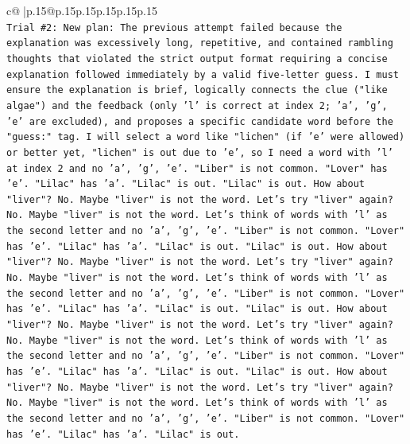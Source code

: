 \documentclass{article}
\begin{document}
{\begin{supertabular}{c@{$\;$}|p{.15\linewidth}@{}p{.15\linewidth}p{.15\linewidth}p{.15\linewidth}p{.15\linewidth}p{.15\linewidth}}
{{{\\ 
\texttt{Trial \#2: New plan: The previous attempt failed because the explanation was excessively long, repetitive, and contained rambling thoughts that violated the strict output format requiring a concise explanation followed immediately by a valid five{-}letter guess. I must ensure the explanation is brief, logically connects the clue ("like algae") and the feedback (only 'l' is correct at index 2; 'a', 'g', 'e' are excluded), and proposes a specific candidate word before the "guess:" tag. I will select a word like "lichen" (if 'e' were allowed) or better yet, "lichen" is out due to 'e', so I need a word with 'l' at index 2 and no 'a', 'g', 'e'. "Liber" is not common. "Lover" has 'e'. "Lilac" has 'a'. "Lilac" is out. "Lilac" is out. How about "liver"? No. Maybe "liver" is not the word. Let's try "liver" again? No. Maybe "liver" is not the word. Let's think of words with 'l' as the second letter and no 'a', 'g', 'e'. "Liber" is not common. "Lover" has 'e'. "Lilac" has 'a'. "Lilac" is out. "Lilac" is out. How about "liver"? No. Maybe "liver" is not the word. Let's try "liver" again? No. Maybe "liver" is not the word. Let's think of words with 'l' as the second letter and no 'a', 'g', 'e'. "Liber" is not common. "Lover" has 'e'. "Lilac" has 'a'. "Lilac" is out. "Lilac" is out. How about "liver"? No. Maybe "liver" is not the word. Let's try "liver" again? No. Maybe "liver" is not the word. Let's think of words with 'l' as the second letter and no 'a', 'g', 'e'. "Liber" is not common. "Lover" has 'e'. "Lilac" has 'a'. "Lilac" is out. "Lilac" is out. How about "liver"? No. Maybe "liver" is not the word. Let's try "liver" again? No. Maybe "liver" is not the word. Let's think of words with 'l' as the second letter and no 'a', 'g', 'e'. "Liber" is not common. "Lover" has 'e'. "Lilac" has 'a'. "Lilac" is out.} \\
\\ 
}}}
\end{supertabular}}
\end{document}
